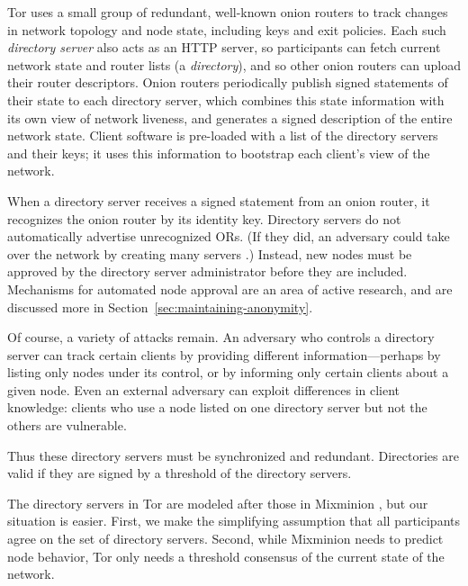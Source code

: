 \documentclass[times,10pt,twocolumn]{article}
\begin{document}
Tor uses a small group of redundant, well-known onion routers to
track changes in network topology and node state, including keys and
exit policies.  Each such \emph{directory server} also acts as an HTTP
server, so participants can fetch current network state and router
lists (a \emph{directory}), and so other onion routers can upload
their router descriptors.  Onion routers periodically publish signed
statements of their state to each directory server, which combines this
state information with its own view of network liveness, and generates
a signed description of the entire network state. Client software is
pre-loaded with a list of the directory servers and their keys; it uses
this information to bootstrap each client's view of the network.

When a directory server receives a signed statement from an onion
router, it recognizes the onion router by its identity key. Directory
servers do not automatically advertise unrecognized ORs. (If they did,
an adversary could take over the network by creating many servers
\cite{sybil}.) Instead, new nodes must be approved by the directory
server administrator before they are included. Mechanisms for automated
node approval are an area of active research, and are discussed more
in Section~\ref{sec:maintaining-anonymity}.
  
Of course, a variety of attacks remain. An adversary who controls
a directory server can track certain clients by providing different
information---perhaps by listing only nodes under its control, or by
informing only certain clients about a given node. Even an external
adversary can exploit differences in client knowledge: clients who use
a node listed on one directory server but not the others are vulnerable.

Thus these directory servers must be synchronized and redundant.
Directories are valid if they are signed by a threshold of the directory
servers.

The directory servers in Tor are modeled after those in Mixminion
\cite{minion-design}, but our situation is easier. First, we make the
simplifying assumption that all participants agree on the set of
directory servers. Second, while Mixminion needs to predict node
behavior, Tor only needs a threshold consensus of the current
state of the network.
\end{document}
